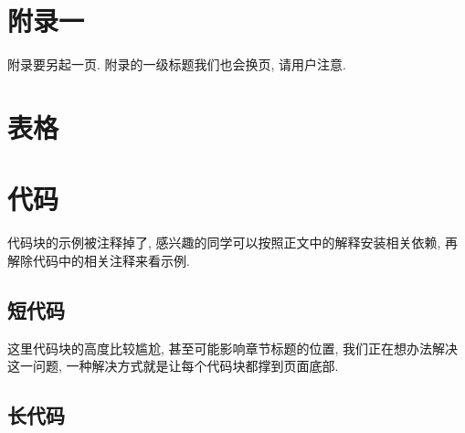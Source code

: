 
\section{附录一}

附录要另起一页. 附录的一级标题我们也会换页, 请用户注意.

\zhlipsum

\section{表格}


\section{代码}

代码块的示例被注释掉了, 感兴趣的同学可以按照正文中的解释安装相关依赖, 再解除代码中的相关注释来看示例.

\subsection{短代码}

这里代码块的高度比较尴尬, 甚至可能影响章节标题的位置, 我们正在想办法解决这一问题, 一种解决方式就是让每个代码块都撑到页面底部.


\subsection{长代码}

